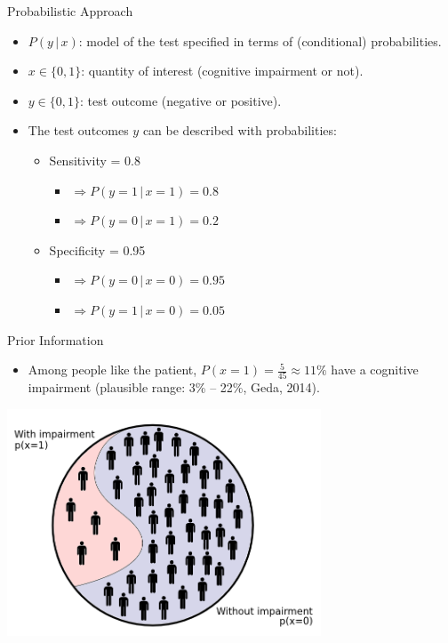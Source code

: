 \documentclass{beamer}
\begin{document}
\begin{frame}{Probabilistic Approach}
  \begin{itemize}
  \item $P(y\,|\,x)$: model of the test specified in terms of (conditional) probabilities.
  \item $x \in \{0, 1\}$: quantity of interest (cognitive impairment or not).
  \item $y \in \{0, 1\}$: test outcome (negative or positive).
  \item The test outcomes $y$ can be described with probabilities:
  \begin{itemize}
  \item Sensitivity = 0.8
    \begin{itemize}
    \item $\Rightarrow P(y = 1\,|\,x = 1) = 0.8$
    \item $\Rightarrow P(y = 0\,|\,x = 1) = 0.2$
    \end{itemize}
  \item Specificity = 0.95
    \begin{itemize}
    \item $\Rightarrow P(y = 0\,|\,x = 0) = 0.95$
    \item $\Rightarrow P(y = 1\,|\,x = 0) = 0.05$
    \end{itemize}
  \end{itemize}
\end{itemize}
\end{frame}


\begin{frame}{Prior Information}
\begin{itemize}
  \item Among people like the patient, $P(x = 1) = \frac{5}{45} \approx 11\%$ have a cognitive impairment (plausible range: 3\% – 22\%, Geda, 2014).
  \end{itemize}
  \begin{center}
    \includegraphics[width=0.7\textwidth]{prior.png}
  \end{center}
\end{frame}
\end{document}
